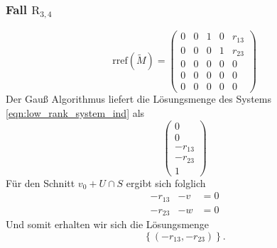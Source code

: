 \documentclass[a4paper,oneside, 11pt, openany%
]{article}
\theoremstyle{custom}
\theoremstyle{custom}
\begin{document}
\subsubsection*{Fall $\text{R}_{3,4}$}
\begin{equation*}\label{eqn:rref_r34}
	\text{rref}(\tilde{M}) =
	\left( \begin{array}{ccccc}
		0&0&1&0&r_{13}\\
		0&0&0&1&r_{23}\\
		0&0&0&0&0\\
		0&0&0&0&0\\
		0&0&0&0&0
	\end{array}\right)
\end{equation*}
Der Gauß Algorithmus liefert die Lösungsmenge des Systems \eqref{eqn:low_rank_system_ind} als
\begin{equation*}
	\begin{pmatrix}
		0\\
		0\\
		-r_{13}\\
		-r_{23}\\
		1
	\end{pmatrix}
\end{equation*}
Für den Schnitt $v_0 + U \cap S $ ergibt sich folglich
\begin{equation*}
	\begin{alignedat}{2}
		-r_{13}&-v&=0\\
		-r_{23}&-w&=0
	\end{alignedat}
\end{equation*}
Und somit erhalten wir sich die Lösungsmenge
\begin{equation*}
	\left\lbrace (-r_{13},-r_{23}) \right\rbrace.
\end{equation*}
\end{document}
